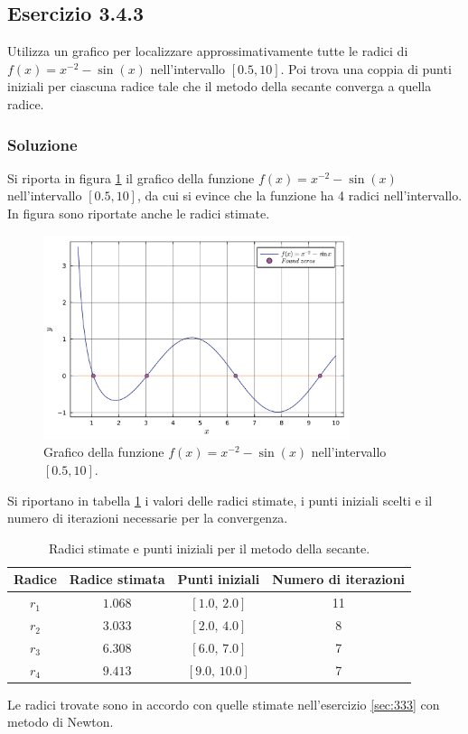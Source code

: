 \documentclass[letterpaper, 12pt]{article}
\numberwithin{equation}{section}    %
\begin{document}
\subsection{Esercizio 3.4.3}
Utilizza un grafico per localizzare approssimativamente tutte le radici di $f(x)=x^{-2}-\sin(x)$ 
nell'intervallo $[0.5,10]$. 
Poi trova una coppia di punti iniziali per ciascuna radice tale che il metodo della secante converga 
a quella radice.

\subsubsection{Soluzione}
Si riporta in figura \ref{fig:es3_4_3_1} il grafico della funzione $f(x)=x^{-2}-\sin(x)$ nell'intervallo
$[0.5,10]$, da cui si evince che la funzione ha 4 radici nell'intervallo. In figura sono riportate anche
le radici stimate.
\begin{figure}[!ht]
    \centering
    \includegraphics[width=0.8\textwidth]{3431.pdf}
    \caption{Grafico della funzione $f(x)=x^{-2}-\sin(x)$ nell'intervallo $[0.5,10]$.}
    \label{fig:es3_4_3_1}
\end{figure}

Si riportano in tabella \ref{tab:es3_4_3_1} i valori delle radici stimate, i punti iniziali scelti e il numero di iterazioni
necessarie per la convergenza.
\begin{table}[!ht]
    \centering
    \begin{tabular}{|c|c|c|c|}
        \hline
        \textbf{Radice} & \textbf{Radice stimata} & \textbf{Punti iniziali} & \textbf{Numero di iterazioni} \\
        \hline
        $r_1$ & $1.068$  & $[1.0,\,2.0]$   & 11  \\
        $r_2$ & $3.033$  & $[2.0,\,4.0]$   & 8  \\
        $r_3$ & $6.308$  & $[6.0,\,7.0]$   & 7  \\
        $r_4$ & $9.413$  & $[9.0,\,10.0]$  & 7  \\
        \hline
    \end{tabular}
    \caption{Radici stimate e punti iniziali per il metodo della secante.}
    \label{tab:es3_4_3_1}
\end{table}
Le radici trovate sono in accordo con quelle stimate nell'esercizio \ref{sec:333} 
con metodo di Newton.
\end{document}
